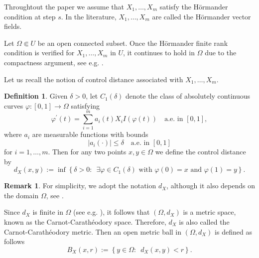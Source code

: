 \documentclass[a4paper,12pt,reqno]{amsart}
\numberwithin{equation}{section}
\theoremstyle{plain}
\theoremstyle{definition}
\newtheorem{definition}[theorem]{Definition}
\newtheorem{remark}[theorem]{Remark}
\begin{document}
Throughtout the paper we assume that   $X_{1}, \ldots, X_{m}$ satisfy the H\"ormander condition at step $s$. In the literature,  $X_{1}, \ldots, X_{m}$  are called the H\"ormander vector fields.

Let $\Omega \Subset U$ be an open connected subset. Once the H\"ormander finite rank condition is verified for  $X_{1}, \ldots, X_{m}$  in $U$, it continues to hold in $\Omega$ due to the compactness argument, see e.g. \cite[Proposition 1.25]{bramanti2023hormander}.

Let us recall the notion of control distance associated with  $X_{1}, \ldots, X_{m}$.
\begin{definition}
Given $\delta>0$, let $C_{1}(\delta)$ denote the class of absolutely continuous curves $\varphi:[0,1] \rightarrow \Omega$ satisfying
$$
\varphi^{\prime}(t)=\sum_{i=1}^{m} a_{i}(t)X_{i}I\left({\varphi(t)}\right)\quad  \text {a.e. in } [0,1],
$$
where $a_{i}$ are measurable functions with bounds
$$
\left|a_{i}(\cdot)\right| \leq \delta \quad \text {a.e. in } [0,1] 
$$
for $i=1, \ldots, m$. Then for any two points $x,y\in \Omega$ we define the control distance by
\begin{equation*}
d_{X}(x, y):=\inf \left\{\delta>0:\enspace \exists \varphi \in C_{1}(\delta) \text { with } \varphi(0)=x \text{ and } \varphi(1)=y\right\}.
\end{equation*}
\end{definition} 

\begin{remark}
For simplicity, we adopt the notation $d_{X}$, although it also depends on the domain $\Omega$,  see \cite[Remark 1.30]{bramanti2023hormander}.
\end{remark}
Since $d_{X}$ is finite in $\Omega$ (see e.g. \cite[Theorem 1.45]{bramanti2023hormander}), it follows that $(\Omega, d_{X})$ is a metric space, known as the Carnot-Carath\'eodory space. Therefore,  $d_{X}$ is also called the Carnot-Carath\'eodory metric. Then an open metric ball in $(\Omega, d_{X})$ is defined as follows
$$
B_{X}(x, r):=\left\{y \in \Omega: \enspace d_{X}(x, y)<r\right\}.
$$
\end{document}
